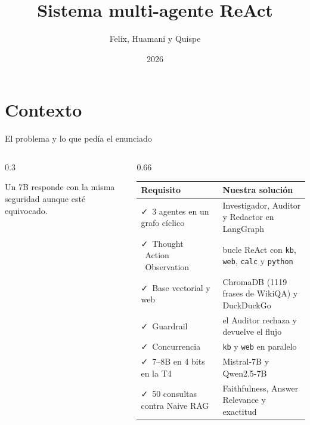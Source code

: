 \documentclass[aspectratio=1610, 11pt]{beamer}
\title[Multi-agente ReAct]{Sistema multi-agente ReAct}
\author[Grupo]{Felix, Huamani y Quispe}
\institute{UTEC}
\date{2026}
\newcommand{\req}[2]{\textcolor{cOk}{\faCheck}\ #1 & #2 \\}
\begin{document}
{
\begin{frame}[plain]
  \slatetitlepage
\end{frame}}

\section{Contexto}

\begin{frame}{El problema y lo que pedía el enunciado}
  \begin{columns}[c,onlytextwidth]
    \begin{column}{0.3\textwidth}
      \vspace{3mm}
      {\footnotesize Un 7B responde con la misma seguridad aunque esté equivocado.\par}
    \end{column}
    \begin{column}{0.66\textwidth}
      {\footnotesize
      \renewcommand{\arraystretch}{1.3}
      \begin{tabular}{@{}>{\raggedright\arraybackslash}p{38mm}>{\raggedright\arraybackslash}p{49mm}@{}}
        \textcolor{cSrc}{Requisito} & \textcolor{cSrc}{Nuestra solución} \\
        \midrule
        \req{3 agentes en un grafo cíclico}{Investigador, Auditor y Redactor en LangGraph}
        \req{Thought \textrightarrow\ Action \textrightarrow\ Observation}{bucle ReAct con \texttt{kb}, \texttt{web}, \texttt{calc} y \texttt{python}}
        \req{Base vectorial y web}{ChromaDB (1119 frases de WikiQA) y DuckDuckGo}
        \req{Guardrail}{el Auditor rechaza y devuelve el flujo}
        \req{Concurrencia}{\texttt{kb} y \texttt{web} en paralelo}
        \req{7--8B en 4 bits en la T4}{Mistral-7B y Qwen2.5-7B}
        \req{50 consultas contra Naive RAG}{Faithfulness, Answer Relevance y exactitud}
        \bottomrule
      \end{tabular}\par}
    \end{column}
  \end{columns}
\end{frame}
\end{document}
